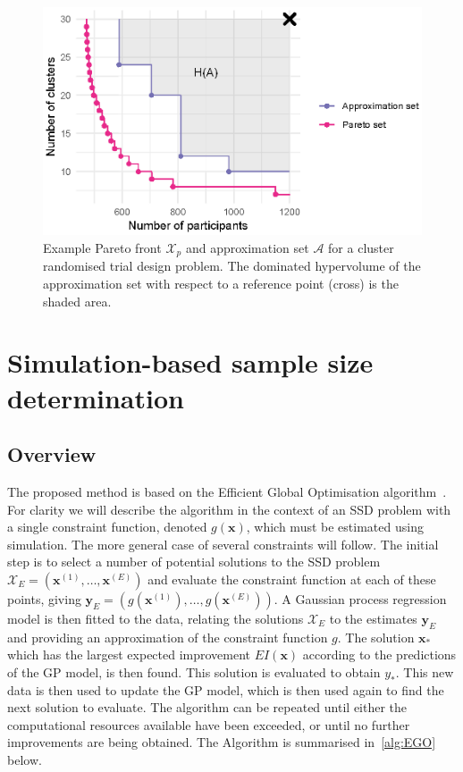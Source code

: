 \documentclass[sagev, Crown]{sagej}
\begin{document}
\begin{figure}
\centering
\includegraphics[scale=0.8]{./figures/fake_pareto.eps}
\caption{Example Pareto front $\mathcal{X}_{p}$ and approximation set $\mathcal{A}$ for a cluster randomised trial design problem. The dominated hypervolume of the approximation set with respect to a reference point (cross) is the shaded area.}
\label{fig:fake_pareto}
\end{figure}


\section{Simulation-based sample size determination}\label{sec:methods}

\subsection{Overview}

The proposed method is based on the Efficient Global Optimisation algorithm~\cite{Jones1998}. For clarity we will describe the algorithm in the context of an SSD problem with a single constraint function, denoted $g(\mathbf{x})$, which must be estimated using simulation. The more general case of several constraints will follow. The initial step is to select a number of potential solutions to the SSD problem $\mathcal{X}_{E} = (\mathbf{x}^{(1)}, \ldots , \mathbf{x}^{(E)})$ and evaluate the constraint function at each of these points, giving $\mathbf{y}_{E} = (g(\mathbf{x}^{(1)}), \ldots , g(\mathbf{x}^{(E)}))$. A Gaussian process regression model is then fitted to the data, relating the solutions $\mathcal{X}_{E}$ to the estimates $\mathbf{y}_{E}$ and providing an approximation of the constraint function $g$. The solution $\mathbf{x}_{*}$ which has the largest expected improvement $EI(\mathbf{x})$ according to the predictions of the GP model, is then found. This solution is evaluated to obtain $y_*$. This new data is then used to update the GP model, which is then used again to find the next solution to evaluate. The algorithm can be repeated until either the computational resources available have been exceeded, or until no further improvements are being obtained. The Algorithm is summarised in~\ref{alg:EGO} below.
\end{document}
